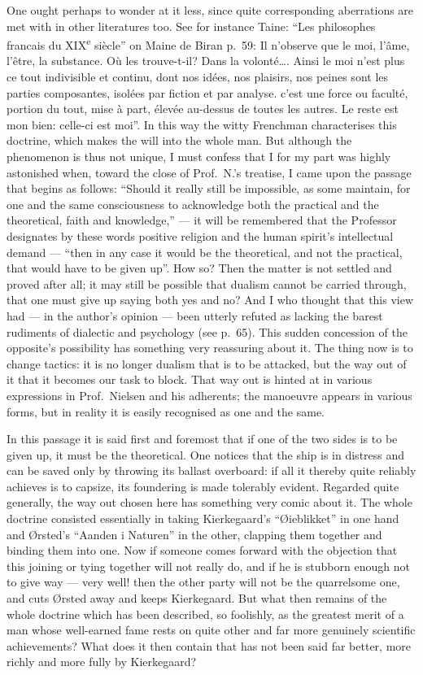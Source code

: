 \documentclass[12pt,a4paper]{book}
\newcommand{\opage}[1]{\marginnote{\footnotesize\textit{[#1]}}}
\begin{document}
One ought perhaps to wonder at it less, since quite corresponding aberrations
are met with in other literatures too. See for instance Taine: ``Les
philosophes francais du XIX\textsuperscript{e} siècle'' on Maine de Biran p.\
59: Il n'observe que le moi, l'âme, l'être, la substance. Où les trouve-t-il?
Dans la volonté\dots. Ainsi le moi n'est plus ce tout indivisible et continu,
dont nos idées, nos plaisirs, nos peines sont les parties composantes, isolées
par fiction et par analyse. c'est une force ou faculté, portion du tout, mise à
part, élevée au-dessus de toutes les autres. Le reste est mon bien: celle-ci
est moi''. In this way the witty Frenchman characterises this doctrine, which
makes
\opage{66}the will into the whole man. But although the phenomenon is thus not
unique, I must confess that I for my part was highly astonished when, toward
the close of Prof.\ N.'s treatise, I came upon the passage that begins as
follows: ``Should it really still be impossible, as some maintain, for one and
the same consciousness to acknowledge both the practical and the theoretical,
faith and knowledge,'' --- it will be remembered that the Professor designates
by these words positive religion and the human spirit's intellectual demand ---
``then in any case it would be the theoretical, and not the practical, that
would have to be given up''. How so? Then the matter is not settled and proved
after all; it may still be possible that dualism cannot be carried through,
that one must give up saying both yes and no? And I who thought that this view
had --- in the author's opinion --- been utterly refuted as lacking the barest
rudiments of dialectic and psychology (see p.\ 65). This sudden concession of
the opposite's possibility has something very reassuring about it. The thing
now is to change tactics: it is no longer dualism that is to be attacked, but
the way out of it that it becomes our task to block. That way out is hinted at
in various expressions in Prof.\ Nielsen and his adherents; the manoeuvre
appears in various forms, but in reality it is easily recognised as one and the
same.

In this passage it is said first and foremost that if one of the two sides is
to be given up, it must be the
\opage{67}theoretical. One notices that the ship is in distress and can be
saved only by throwing its ballast overboard: if all it thereby quite reliably
achieves is to capsize, its foundering is made tolerably evident. Regarded
quite generally, the way out chosen here has something very comic about it. The
whole doctrine consisted essentially in taking Kierkegaard's ``Øieblikket'' in
one hand and Ørsted's ``Aanden i Naturen'' in the other, clapping them together
and binding them into one. Now if someone comes forward with the objection that
this joining or tying together will not really do, and if he is stubborn enough
not to give way --- very well! then the other party will not be the quarrelsome
one, and cuts Ørsted away and keeps Kierkegaard. But what then remains of the
whole doctrine which has been described, so foolishly, as the greatest merit of
a man whose well-earned fame rests on quite other and far more genuinely
scientific achievements? What does it then contain that has not been said far
better, more richly and more fully by Kierkegaard?
\end{document}
